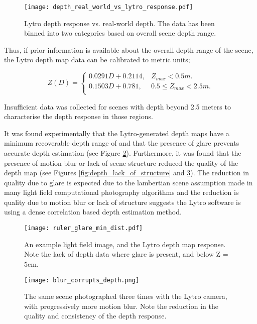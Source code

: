 \begin{figure}[h]
\centering
\caption[Lytro depth response vs. real-world depth]{Lytro depth response vs. real-world depth. The data has been binned into two categories based on overall scene depth range.}
\label{fig:depth_real_world_vs_lytro_response}
\texttt{[image: depth\_real\_world\_vs\_lytro\_response.pdf]}
\end{figure}

Thus, if prior information is available about the overall depth range of the scene, the Lytro depth map data can be calibrated to metric units;

\begin{equation}
\label{eq:lytro_dm_to_metric}
Z(D) = \begin{cases}
	0.0291 D + 0.2114, & Z_{max} < 0.5m. \\
	0.1503 D + 0.781, & 0.5 \leq Z_{max} < 2.5m. \\
\end{cases}
\end{equation}

Insufficient data was collected for scenes with depth beyond 2.5 meters to characterise the depth response in those regions.

It was found experimentally that the Lytro-generated depth maps have a minimum recoverable depth range of  and that the presence of glare prevents accurate depth estimation (see Figure \ref{fig:ruler_glare_min_dist}).
Furthermore, it was found that the presence of motion blur or lack of scene structure reduced the quality of the depth map (see Figures \ref{fig:depth_lack_of_structure} and \ref{fig:blur_corrupts_depth}).
The reduction in quality due to glare is expected due to the lambertian scene assumption made in many light field computational photography algorithms \cite{bishop2009light, liang2011light, baker2003shape} and the reduction is quality due to motion blur or lack of structure suggests the Lytro software is using a dense correlation based depth estimation method.


\begin{figure}
\centering
\texttt{[image: ruler\_glare\_min\_dist.pdf]}
\caption[Minimum depth map distance and the effect of glare]{An example light field image, and the Lytro depth map response. Note the lack of depth data where glare is present, and below Z = 5cm.}
\label{fig:ruler_glare_min_dist}
\end{figure}

\begin{figure}
\centering
\texttt{[image: blur\_corrupts\_depth.png]}
\caption[Motion Blur Corrupts Lytro Depth Estimation]{The same scene photographed three times with the Lytro camera, with progressively more motion blur. Note the reduction in the quality and consistency of the depth response.}
\label{fig:blur_corrupts_depth}
\end{figure}

